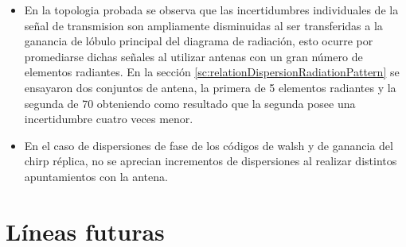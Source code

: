 \begin{itemize}
	\item En la topologia probada se observa que las incertidumbres individuales de la señal de transmision son ampliamente
		disminuidas al ser transferidas a la ganancia de lóbulo principal del diagrama de radiación, esto ocurre por
		promediarse dichas señales al utilizar antenas con un gran número de elementos radiantes. En la sección
		\ref{sc:relationDispersionRadiationPattern} se ensayaron dos conjuntos de antena, la primera de 5 elementos radiantes y
		la segunda de 70 obteniendo como resultado que la segunda posee una incertidumbre cuatro veces menor.
	\item En el caso de dispersiones de fase de los códigos de walsh y de ganancia del chirp réplica, no se aprecian incrementos
		de dispersiones al realizar distintos apuntamientos con la antena.
\end{itemize}

\section{Líneas futuras}

